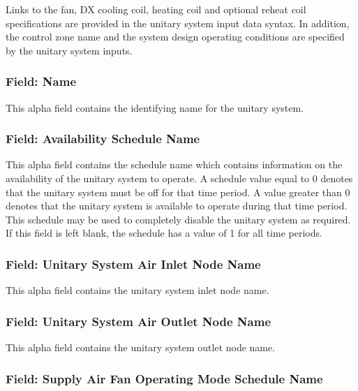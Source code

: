 Links to the fan, DX cooling coil, heating coil and optional reheat coil specifications are provided in the unitary system input data syntax. In addition, the control zone name and the system design operating conditions are specified by the unitary system inputs.

\subsubsection{Field: Name}\label{field-name-3-034}

This alpha field contains the identifying name for the unitary system.

\subsubsection{Field: Availability Schedule Name}\label{field-availability-schedule-name-2-008}

This alpha field contains the schedule name which contains information on the availability of the unitary system to operate. A schedule value equal to 0 denotes that the unitary system must be off for that time period. A value greater than 0 denotes that the unitary system is available to operate during that time period. This schedule may be used to completely disable the unitary system as required. If this field is left blank, the schedule has a value of 1 for all time periods.

\subsubsection{Field: Unitary System Air Inlet Node Name}\label{field-unitary-system-air-inlet-node-name-1}

This alpha field contains the unitary system inlet node name.

\subsubsection{Field: Unitary System Air Outlet Node Name}\label{field-unitary-system-air-outlet-node-name-1}

This alpha field contains the unitary system outlet node name.

\subsubsection{Field: Supply Air Fan Operating Mode Schedule Name}\label{field-unitaryheatcool-supply-air-fan-operating-mode-schedule-name}

